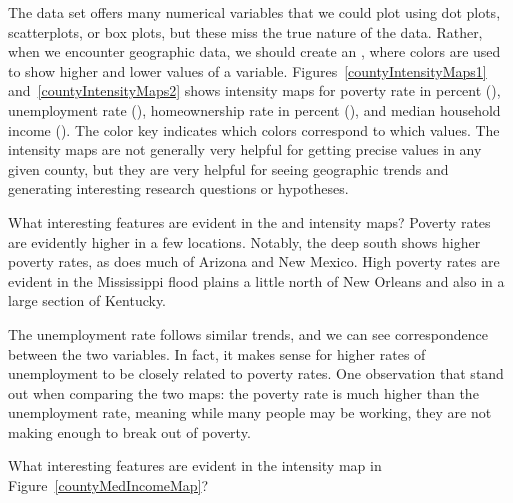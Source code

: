 The  data set offers many numerical variables
that we could plot using dot plots, scatterplots,
or box plots, but these miss the true nature of the data.
Rather, when we encounter geographic data, we should create
an , where colors are used
to show higher and lower values of a variable.
Figures~\ref{countyIntensityMaps1}
and~\ref{countyIntensityMaps2} shows intensity maps for
poverty rate in percent (),
unemployment rate (),
homeownership rate in percent (),
and median household income
().
The color key indicates which colors correspond to which values.
The intensity maps are not generally very helpful
for getting precise values in any given county,
but they are very helpful for seeing geographic trends
and generating interesting research questions or hypotheses.

\begin{examplewrap}
\begin{nexample}{What interesting features are evident in the
     and 
    intensity maps?}
  Poverty rates are evidently higher in a few locations.
  Notably, the deep south shows higher poverty rates,
  as does much of Arizona and New Mexico.
  High poverty rates are evident in the Mississippi
  flood plains a little north of New Orleans and
  also in a large section of Kentucky.

  The unemployment rate follows similar trends,
  and we can see correspondence between the two
  variables. In fact, it makes sense for higher rates
  of unemployment to be closely related to poverty rates.
  One observation that stand out when comparing the two maps:
  the poverty rate is much higher than the unemployment
  rate, meaning while many people may be working,
  they are not making enough to break out of poverty.
\end{nexample}
\end{examplewrap}

\begin{exercisewrap}
\begin{nexercise}
What interesting features are evident in the
 intensity map in
Figure~\ref{countyMedIncomeMap}?\footnotemark{}
\end{nexercise}
\end{exercisewrap}

